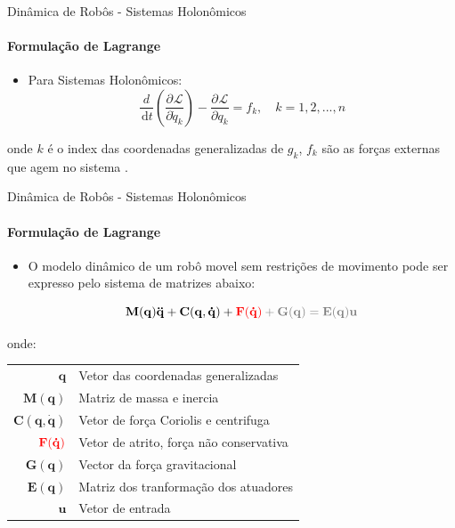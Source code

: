 \documentclass{beamer}
\newcommand{\df}[1]{\,\mathrm{d}#1}
\newcommand{\parcial}[3]{\dfrac{\partial^{#1}#2}{\partial #3^{#1}}}
\begin{document}
\begin{frame}{Dinâmica de Robôs - Sistemas Holonômicos}
    \framesubtitle{Formulação de Lagrange}

    \begin{itemize}
        \item Para Sistemas Holonômicos:
              \begin{equation}
                  \frac{d}{\df{t}}\left( \parcial{}{\mathcal{L}}{\dot{q}_k}\right)
                  -\parcial{}{\mathcal{L}}{q_k}
                  = f_k, \quad k = 1,2,...,n
              \end{equation}

    \end{itemize}
    \begin{block}{}
        onde $k$ é o index das coordenadas generalizadas de $g_k$, $f_k$ são as forças externas que agem no sistema .
    \end{block} 
\end{frame}


\begin{frame}{Dinâmica de Robôs - Sistemas Holonômicos}
    \framesubtitle{Formulação de Lagrange}
    \begin{itemize}
        \item O modelo dinâmico de um robô movel sem restrições de movimento pode ser expresso pelo sistema de matrizes abaixo:

              \begin{equation}
                  \mathbf{M(q)\ddot{q}+ C(q, \dot{q})+ \color{red}{F(\dot{q})}\color{gray}+G(q) = E(q)u}
              \end{equation}
    \end{itemize}

    \begin{block}{}
        \scriptsize{
            onde:
            \begin{tabular}{ r | l }
                $\mathbf{q}$               & Vetor das coordenadas generalizadas   \\
                $\mathbf{M(q)}$            & Matriz de massa e inercia             \\
                $\mathbf{C(q, \dot{q})}$   & Vetor de força Coriolis e centrifuga  \\
                $\color{red}{\mathbf{F(\dot{q})}}$      & Vetor de atrito, força não conservativa\footnotemark\\
                $\mathbf{G(q)}$            & Vector da força gravitacional         \\
                $\mathbf{E(q)}$            & Matriz dos tranformação dos atuadores \\
                $\mathbf{u}$               & Vetor de entrada                      \\
            \end{tabular}}
    \end{block}
\end{frame}
\end{document}
